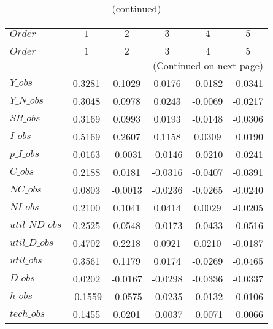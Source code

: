  
\begin{center}
\begin{longtable}{lccccc} 
\caption{COEFFICIENTS OF AUTOCORRELATION}\\
 \label{Table:th_autocorr_matrix}\\
\toprule 
$Order          $	 & 	 $          1$	 & 	 $          2$	 & 	 $          3$	 & 	 $          4$	 & 	 $          5$\\
\midrule \endfirsthead 
\caption{(continued)}\\
 \toprule \\ 
$Order          $	 & 	 $          1$	 & 	 $          2$	 & 	 $          3$	 & 	 $          4$	 & 	 $          5$\\
\midrule \endhead 
\midrule \multicolumn{6}{r}{(Continued on next page)} \\ \bottomrule \endfoot 
\bottomrule \endlastfoot 
$Y\_obs         $	 & 	     0.3281	 & 	     0.1029	 & 	     0.0176	 & 	    -0.0182	 & 	    -0.0341 \\ 
$Y\_N\_obs      $	 & 	     0.3048	 & 	     0.0978	 & 	     0.0243	 & 	    -0.0069	 & 	    -0.0217 \\ 
$SR\_obs        $	 & 	     0.3169	 & 	     0.0993	 & 	     0.0193	 & 	    -0.0148	 & 	    -0.0306 \\ 
$I\_obs         $	 & 	     0.5169	 & 	     0.2607	 & 	     0.1158	 & 	     0.0309	 & 	    -0.0190 \\ 
$p\_I\_obs      $	 & 	     0.0163	 & 	    -0.0031	 & 	    -0.0146	 & 	    -0.0210	 & 	    -0.0241 \\ 
$C\_obs         $	 & 	     0.2188	 & 	     0.0181	 & 	    -0.0316	 & 	    -0.0407	 & 	    -0.0391 \\ 
$NC\_obs        $	 & 	     0.0803	 & 	    -0.0013	 & 	    -0.0236	 & 	    -0.0265	 & 	    -0.0240 \\ 
$NI\_obs        $	 & 	     0.2100	 & 	     0.1041	 & 	     0.0414	 & 	     0.0029	 & 	    -0.0205 \\ 
$util\_ND\_obs  $	 & 	     0.2525	 & 	     0.0548	 & 	    -0.0173	 & 	    -0.0433	 & 	    -0.0516 \\ 
$util\_D\_obs   $	 & 	     0.4702	 & 	     0.2218	 & 	     0.0921	 & 	     0.0210	 & 	    -0.0187 \\ 
$util\_obs      $	 & 	     0.3561	 & 	     0.1179	 & 	     0.0174	 & 	    -0.0269	 & 	    -0.0465 \\ 
$D\_obs         $	 & 	     0.0202	 & 	    -0.0167	 & 	    -0.0298	 & 	    -0.0336	 & 	    -0.0337 \\ 
$h\_obs         $	 & 	    -0.1559	 & 	    -0.0575	 & 	    -0.0235	 & 	    -0.0132	 & 	    -0.0106 \\ 
$tech\_obs      $	 & 	     0.1455	 & 	     0.0201	 & 	    -0.0037	 & 	    -0.0071	 & 	    -0.0066 \\ 
\end{longtable}
 \end{center}
